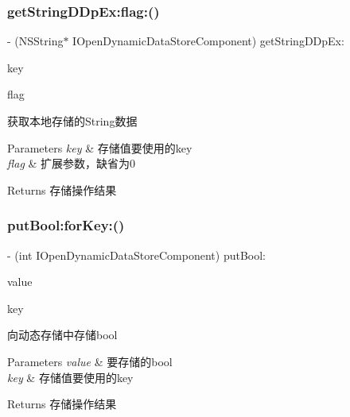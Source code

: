 \subsubsection{\texorpdfstring{get\+String\+D\+Dp\+Ex\+:flag\+:()}{getStringDDpEx:flag:()}}
{\footnotesize\ttfamily -\/ (N\+S\+String$\ast$ I\+Open\+Dynamic\+Data\+Store\+Component) get\+String\+D\+Dp\+Ex\+: \begin{DoxyParamCaption}\item[{(N\+S\+String $\ast$)}]{key }\item[{flag:(int)}]{flag }\end{DoxyParamCaption}}

获取本地存储的\+String数据 
\begin{DoxyParams}{Parameters}
{\em key} & 存储值要使用的key \\
\hline
{\em flag} & 扩展参数，缺省为0 \\
\hline
\end{DoxyParams}
\begin{DoxyReturn}{Returns}
存储操作结果 
\end{DoxyReturn}
\mbox{\label{protocol_i_open_dynamic_data_store_component_01-p_a8f8c0b3caa7a41e3ae888489c085eaa6}} 
\subsubsection{\texorpdfstring{put\+Bool\+:for\+Key\+:()}{putBool:forKey:()}}
{\footnotesize\ttfamily -\/ (int I\+Open\+Dynamic\+Data\+Store\+Component) put\+Bool\+: \begin{DoxyParamCaption}\item[{(B\+O\+OL)}]{value }\item[{forKey:(N\+S\+String $\ast$)}]{key }\end{DoxyParamCaption}}

向动态存储中存储bool 
\begin{DoxyParams}{Parameters}
{\em value} & 要存储的bool \\
\hline
{\em key} & 存储值要使用的key \\
\hline
\end{DoxyParams}
\begin{DoxyReturn}{Returns}
存储操作结果 
\end{DoxyReturn}
\mbox{\label{protocol_i_open_dynamic_data_store_component_01-p_a12c66ca2ebd8ce9758335c864ec9b844}} 
